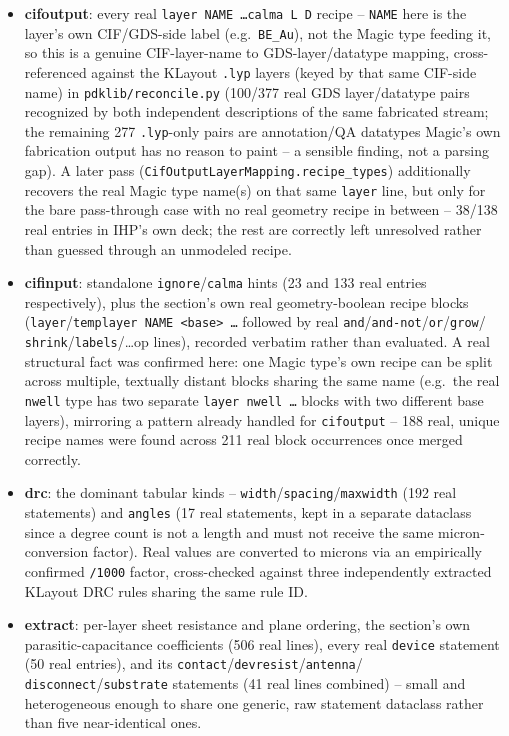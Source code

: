 \documentclass[a4paper,11pt]{article}
\begin{document}
\begin{itemize}[leftmargin=1.4em]
  \item \textbf{cifoutput}: every real \texttt{layer NAME \ldots calma L D}
    recipe -- \texttt{NAME} here is the layer's own CIF/GDS-side
    label (e.g.\ \texttt{BE\_Au}), not the Magic type feeding it, so
    this is a genuine CIF-layer-name to GDS-layer/datatype mapping,
    cross-referenced against the KLayout \texttt{.lyp} layers (keyed
    by that same CIF-side name) in
    \texttt{pdklib/reconcile.py} (100/377 real GDS layer/datatype pairs
    recognized by both independent descriptions of the same
    fabricated stream; the remaining 277 \texttt{.lyp}-only pairs are
    annotation/QA datatypes Magic's own fabrication output has no
    reason to paint -- a sensible finding, not a parsing gap). A later
    pass (\texttt{CifOutputLayerMapping.recipe\_types}) additionally
    recovers the real Magic type name(s) on that same \texttt{layer}
    line, but only for the bare pass-through case with no real
    geometry recipe in between -- 38/138 real entries in IHP's own
    deck; the rest are correctly left unresolved rather than guessed
    through an unmodeled recipe.
  \item \textbf{cifinput}: standalone \texttt{ignore}/\texttt{calma}
    hints (23 and 133 real entries respectively), plus the section's
    own real geometry-boolean recipe blocks
    (\texttt{layer}/\texttt{templayer NAME <base> \ldots} followed by
    real \texttt{and}/\texttt{and-not}/\texttt{or}/\texttt{grow}/\allowbreak
    \texttt{shrink}/\texttt{labels}/\ldots op lines), recorded
    verbatim rather than evaluated. A real structural fact was
    confirmed here: one Magic type's own recipe can be split across
    multiple, textually distant blocks sharing the same name (e.g.\
    the real \texttt{nwell} type has two separate
    \texttt{layer nwell \ldots} blocks with two different base
    layers), mirroring a pattern already handled for
    \texttt{cifoutput} -- 188 real, unique recipe names were found
    across 211 real block occurrences once merged correctly.
  \item \textbf{drc}: the dominant tabular kinds --
    \texttt{width}/\texttt{spacing}/\texttt{maxwidth} (192 real
    statements) and \texttt{angles} (17 real statements, kept in a
    separate dataclass since a degree count is not a length and must
    not receive the same micron-conversion factor). Real values are
    converted to microns via an empirically confirmed
    \texttt{/1000} factor, cross-checked against three independently
    extracted KLayout DRC rules sharing the same rule ID.
  \item \textbf{extract}: per-layer sheet resistance and plane
    ordering, the section's own parasitic-capacitance coefficients
    (506 real lines), every real \texttt{device} statement (50 real
    entries), and its \texttt{contact}/\texttt{devresist}/\texttt{antenna}/\allowbreak
    \texttt{disconnect}/\texttt{substrate} statements (41 real lines
    combined) -- small and heterogeneous enough to share one generic,
    raw statement dataclass rather than five near-identical ones.
\end{itemize}
\end{document}

